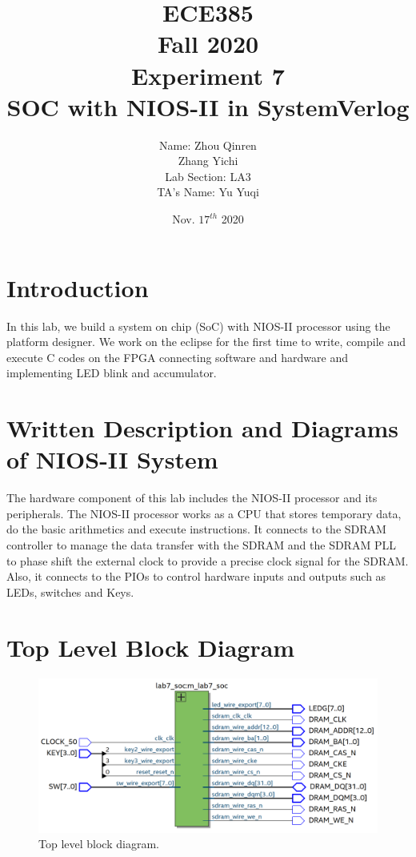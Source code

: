\documentclass[12pt]{article}
\title{
    \textbf{\Huge ECE385} \\
    \huge Fall 2020 \\
    \huge Experiment 7 \\[120pt]
    \textbf{\Huge SOC with NIOS-II in SystemVerlog} \\[120pt]
    }
\author{
    \large Name: Zhou Qinren \\ 
            \quad\qquad Zhang Yichi \\
    \large Lab Section: LA3 \\
    \large TA's Name: Yu Yuqi
    }
\date{Nov. $17^{th}$ 2020}
\begin{document}
\setlength{\parindent}{0pt}
\maketitle
\newpage

\section{Introduction}
In this lab, we build a system on chip (SoC) with NIOS-II processor using the platform designer. We work on the eclipse for the first time to write, compile and execute C codes on the FPGA connecting software and hardware and implementing LED blink and accumulator.

\section{Written Description and Diagrams of NIOS-II System}
The hardware component of this lab includes the NIOS-II processor and its peripherals. The NIOS-II processor works as a CPU that stores temporary data, do the basic arithmetics and execute instructions. It connects to the SDRAM controller to manage the data transfer with the SDRAM and the SDRAM PLL to phase shift the external clock to provide a precise clock signal for the SDRAM. Also, it connects to the PIOs to control hardware inputs and outputs such as LEDs, switches and Keys.

\section{Top Level Block Diagram}
\begin{figure}[H]
    \centering
    \includegraphics[width=16cm]{top.png}
    \caption{Top level block diagram.}
\end{figure}
\end{document}
